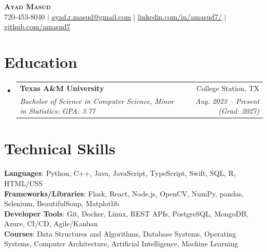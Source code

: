 \documentclass[letterpaper,10pt]{article}
\makeatletter
\newcommand{\resumeSubheading}[4]{
  \vspace{-2pt}\item
    \begin{tabular*}{0.97\textwidth}[t]{l@{\extracolsep{\fill}}r}
      \textbf{#1} & #2 \\
      \textit{\small#3} & \textit{\small #4} \\
    \end{tabular*}\vspace{-7pt}
}
\newcommand{\resumeSubHeadingListStart}{\begin{itemize}[leftmargin=0.15in, label={}, itemsep=-2pt]}
\newcommand{\resumeSubHeadingListEnd}{\end{itemize}}
\makeatother
\begin{document}

\begin{center}
    \textbf{\Huge \scshape Ayad Masud} \\ \vspace{1pt}
    \small 720-453-8040 $|$ \href{mailto:ayad.r.masud@gmail.com}{\underline{ayad.r.masud@gmail.com}} $|$ 
    \href{https://linkedin.com/in/amasud7}{\underline{linkedin.com/in/amasud7/}} $|$
    \href{https://github.com/amasud7}{\underline{github.com/amasud7}}
\end{center}


\section{Education}
  \resumeSubHeadingListStart
    \resumeSubheading
      {Texas A\&M University}{College Station, TX}
      {Bachelor of Science in Computer Science, Minor in Statistics: GPA: 3.77}{Aug. 2023 -- Present (Grad: 2027)}
  \resumeSubHeadingListEnd


\section{Technical Skills}
\begin{itemize}[leftmargin=0.15in, label={}]
   \small{\item{
    \textbf{Languages}{: Python, C++, Java, JavaScript, TypeScript, Swift, SQL, R, HTML/CSS} \\
    \textbf{Frameworks/Libraries}{: Flask, React, Node.js, OpenCV, NumPy, pandas, Selenium, BeautifulSoup, Matplotlib} \\
    \textbf{Developer Tools}{: Git, Docker, Linux, REST APIs, PostgreSQL, MongoDB, Azure, CI/CD, Agile/Kanban} \\
    \textbf{Courses}{: Data Structures and Algorithms, Database Systems, Operating Systems, Computer Architecture, Artificial Intelligence, Machine Learning}
   }}
\end{itemize}
\end{document}
